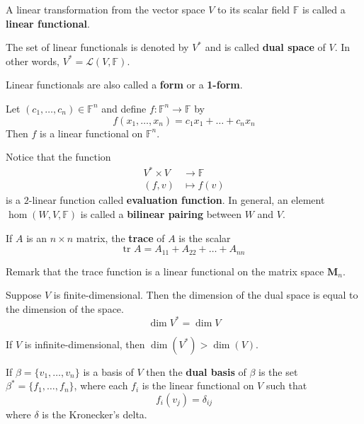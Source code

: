 \begin{definition}
	A linear transformation from the vector space $V$ to its scalar field $\mathbb{F}$ is called a \textbf{linear functional}.
	
	The set of linear functionals is denoted by $V^\ast$ and is called \textbf{dual space} of $V$. In other words, $V^\ast = \mathcal{L}(V, \mathbb{F})$.
\end{definition}

Linear functionals are also called a \textbf{form} or a \textbf{1-form}.

\begin{example}
	Let $(c_1, \ldots, c_n) \in \mathbb{F}^n$ and define $f : \mathbb{F}^n \longrightarrow \mathbb{F}$ by 
	\[
		f(x_1, \ldots, x_n) = c_1 x_1 + \ldots + c_n x_n
	\]
	Then $f$ is a linear functional on $\mathbb{F}^n$.
\end{example}

\begin{example}
Notice that the function 
\begin{equation*}
  \begin{aligned}
    V^\ast \times V &\longrightarrow \mathbb{F} \\
    (f,v) &\longmapsto f(v)
  \end{aligned}
\end{equation*}
is a $2$-linear function called \textbf{evaluation function}. In general, an element $\hom(W,V, \mathbb{F})$ is called a \textbf{bilinear pairing} between $W$ and $V$.
\end{example}

\begin{example}[Trace]
	If $A$ is an $n \times n$ matrix, the \textbf{trace} of $A$ is the scalar
	\[
		\text{tr } A = A_{11} + A_{22} + \ldots + A_{nn}
	\]
	
	Remark that the trace function is a linear functional on the matrix space $\textbf{M}_n$.
\end{example}

\begin{remark}
	Suppose $V$ is finite-dimensional. Then the dimension of the dual space is equal to the dimension of the space.
	\[
		\dim V^\ast = \dim V
	\]

	If $V$ is infinite-dimensional, then $\dim (V^\ast) > \dim (V)$.
\end{remark}

\begin{definition}
	If $\beta = \{ v_1, \ldots, v_n \}$ is a basis of $V$ then the \textbf{dual basis} of $\beta$ is the set $\beta^\ast = \{ f_1, \ldots, f_n \}$, where each $f_i$ is the linear functional on $V$ such that 
	\[
		f_i(v_j) = \delta_{ij}
	\]
	where $\delta$ is the Kronecker's delta.
\end{definition}

